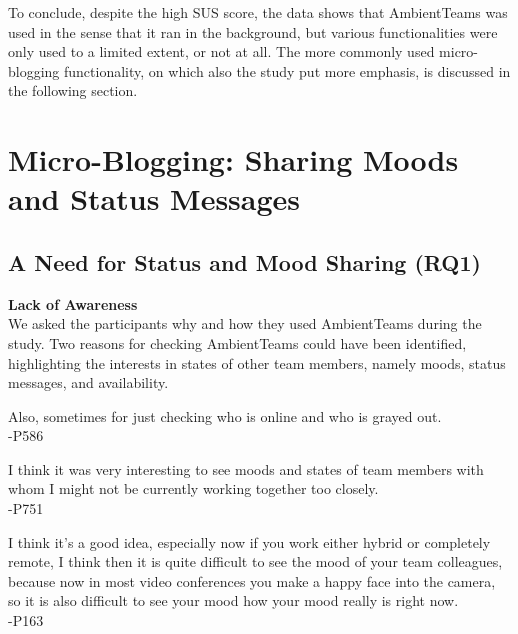 To conclude, despite the high SUS score, the data shows that AmbientTeams was used in the sense that it ran in the background, but various functionalities were only used to a limited extent, or not at all. The more commonly used micro-blogging functionality, on which also the study put more emphasis, is discussed in the following section.


\section{Micro-Blogging: Sharing Moods and Status Messages}
\label{section:micro_blogging}

\subsection{A Need for Status and Mood Sharing (RQ1)}

\textbf{Lack of Awareness} \\
We asked the participants why and how they used AmbientTeams during the study. Two reasons for checking AmbientTeams could have been identified, highlighting the interests in states of other team members, namely moods, status messages, and availability.


\begin{displayquote}
    Also, sometimes for just checking who is online and who is grayed out. \\
    -P586
\end{displayquote}

\begin{displayquote}
    I think it was very interesting to see moods and states of team members with whom I might not be currently working together too closely. \\
    -P751
\end{displayquote}

\begin{displayquote}
    I think it's a good idea, especially now if you work either hybrid or completely remote, I think then it is quite difficult to see the mood of your team colleagues, because now in most video conferences you make a happy face into the camera, so it is also difficult to see your mood how your mood really is right now. \\
    -P163
\end{displayquote}

